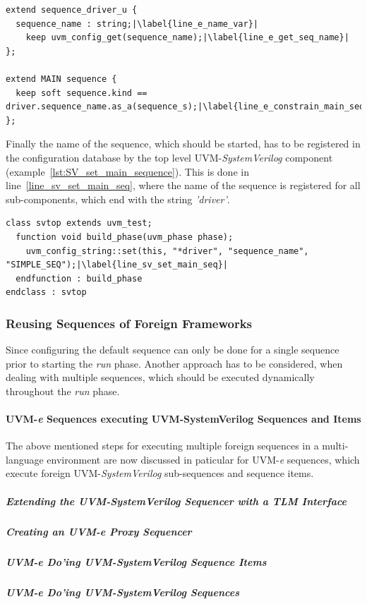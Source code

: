 \lstset{language=e, numbers = left, escapechar=|, breaklines=true}
\begin{lstlisting}[frame=htrbl, caption={\textit{e}: getting the \emph{main} sequence from configuration database},
label={lst:e_get_main_sequence}]
extend sequence_driver_u {
  sequence_name : string;|\label{line_e_name_var}|
    keep uvm_config_get(sequence_name);|\label{line_e_get_seq_name}|
};

extend MAIN sequence {
  keep soft sequence.kind == driver.sequence_name.as_a(sequence_s);|\label{line_e_constrain_main_seq}|
};
\end{lstlisting}
Finally the name of the sequence, which should be started, has to be registered in the configuration database by the top level UVM-\emph{SystemVerilog} component (example~\ref{lst:SV_set_main_sequence}). This is done in line~\ref{line_sv_set_main_seq}, where the name of the sequence is registered for all sub-components, which end with the string \emph{'driver'}.
\lstset{language=SystemVerilog, numbers = left, escapechar=|, breaklines=true}
\begin{lstlisting}[frame=htrbl, caption={SystemVerilog: setting the default sequence via configuration database},
label={lst:SV_set_main_sequence}]
class svtop extends uvm_test;
  function void build_phase(uvm_phase phase);
    uvm_config_string::set(this, "*driver", "sequence_name", "SIMPLE_SEQ");|\label{line_sv_set_main_seq}|
  endfunction : build_phase
endclass : svtop
\end{lstlisting}
\subsubsection{Reusing Sequences of Foreign Frameworks}
Since configuring the default sequence can only be done for a single sequence prior to starting the \emph{run} phase. Another approach has to be considered, when dealing with multiple sequences, which should be executed dynamically throughout the \emph{run} phase.
\paragraph{UVM-\textit{e} Sequences executing UVM-SystemVerilog Sequences and Items}
The above mentioned steps for executing multiple foreign sequences in a multi-language environment are now discussed in paticular for UVM-\textit{e} sequences, which execute foreign UVM-\emph{SystemVerilog} sub-sequences and sequence items.
\subparagraph{Extending the UVM-SystemVerilog Sequencer with a TLM Interface}
\subparagraph{Creating an UVM-\textit{e} Proxy Sequencer}
\subparagraph{UVM-\textit{e} Do'ing UVM-SystemVerilog Sequence Items}
\subparagraph{UVM-\textit{e} Do'ing UVM-SystemVerilog Sequences}
